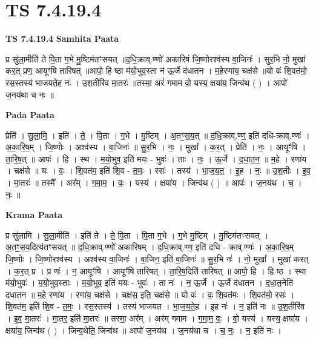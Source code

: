\documentclass[17pt]{extarticle}
\begin{document}
\section{ TS 7.4.19.4 }

\textbf{TS 7.4.19.4 } \newline
\textbf{Samhita Paata} \newline

प्र सु॑ला॒मीति॑ ते पि॒ता ग॒भे मु॒ष्टिम॑तꣳसयत् ॥द॒धि॒क्राव्.ण्णो॑ अकारिषं जि॒ष्णोरश्व॑स्य वा॒जिनः॑ । सुर॒भि नो॒ मुखा॑ कर॒त् प्रण॒ आयूꣳ॑षि तारिषत् ॥आपो॒ हि ष्ठा म॑यो॒भुव॒स्ता न॑ ऊ॒र्जे द॑धातन । म॒हेरणा॑य॒ चक्ष॑से ॥यो वः॑ शि॒वत॑मो॒ रस॒स्तस्य॑ भाजयते॒ह नः॑ । उ॒श॒तीरि॑व मा॒तरः॑ ॥तस्मा॒ अरं॑ गमाम वो॒ यस्य॒ क्षया॑य॒ जिन्व॑थ ( ) । आपो॑ ज॒नय॑था च नः ॥ \newline

\textbf{Pada Paata} \newline

प्रेति॑ । सु॒ला॒मि॒ । इति॑ । ते॒ । पि॒ता । ग॒भे । मु॒ष्टिम् । अ॒तꣳ॒॒स॒य॒त् ॥ द॒धि॒क्राव्.ण्ण॒ इति॑ दधि-क्राव्.ण्णः॑ । अ॒का॒रि॒ष॒म् । जि॒ष्णोः । अश्व॑स्य । वा॒जिनः॑ ॥ सु॒र॒भि । नः॒ । मुखा᳚ । क॒र॒त् । प्रेति॑ । नः॒ । आयूꣳ॑षि । ता॒रि॒ष॒त् ॥ आपः॑ । हि । स्थ । म॒यो॒भुव॒ इति॑ मयः - भुवः॑ । ताः । नः॒ । ऊ॒र्जे । द॒धा॒त॒न॒ ॥ म॒हे । रणा॑य । चक्ष॑से ॥ यः । वः॒ । शि॒वत॑म॒ इति॑ शि॒व - त॒मः॒ । रसः॑ । तस्य॑ । भा॒ज॒य॒त॒ । इ॒ह । नः॒ ॥ उ॒श॒तीः । इ॒व॒ । मा॒तरः॑ ॥ तस्मै᳚ । अर᳚म् । ग॒मा॒म॒ । वः॒ । यस्य॑ । क्षया॑य । जिन्व॑थ ( ) ॥ आपः॑ । ज॒नय॑थ । च॒ । नः॒ ॥  \newline


\textbf{Krama Paata} \newline

प्र सु॑लामि । सु॒ला॒मीति॑ । इति॑ ते । ते॒ पि॒ता । पि॒ता ग॒भे । ग॒भे मु॒ष्टिम् । मु॒ष्टिम॑तꣳसयत् । अ॒तꣳ॒॒स॒य॒दित्य॑तꣳसयत् ॥ द॒धि॒क्राव्.ण्णो॑ अकारिषम् । द॒धि॒क्राव्.ण्ण॒ इति॑ दधि - क्राव्.ण्णः॑ । अ॒का॒रि॒ष॒म् जि॒ष्णोः । जि॒ष्णोरश्व॑स्य । अश्व॑स्य वा॒जिनः॑ । वा॒जिन॒ इति॑ वा॒जिनः॑ ॥ सु॒र॒भि नः॑ । नो॒ मुखा᳚ । मुखा॑ करत् । क॒र॒त् प्र । प्र णः॑ । न॒ आयूꣳ॑षि । आयूꣳ॑षि तारिषत् । ता॒रि॒ष॒दिति॑ तारिषत् ॥ आपो॒ हि । हि ष्ठ । स्था म॑यो॒भुवः॑ । म॒यो॒भुव॒स्ताः । म॒यो॒भुव॒ इति॑ मयः - भुवः॑ । ता नः॑ । न॒ ऊ॒र्जे । ऊ॒र्जे द॑धातन । द॒धा॒त॒नेति॑ दधातन ॥ म॒हे रणा॑य । रणा॑य॒ चक्ष॑से । चक्ष॑स॒ इति॒ चक्ष॑से ॥ यो वः॑ । वः॒ शि॒वत॑मः । शि॒वत॑मो॒ रसः॑ । शि॒वत॑म॒ इति॑ शि॒व - त॒मः॒ । रस॒स्तस्य॑ । तस्य॑ भाजयत । भा॒ज॒य॒ते॒ह । इ॒ह नः॑ । न॒ इति॑ नः ॥ उ॒श॒तीरि॑व । इ॒व॒ मा॒तरः॑ । मा॒तर॒ इति॑ मा॒तरः॑ ॥ तस्मा॒ अर᳚म् । अर॑म् गमाम । ग॒मा॒म॒ वः॒ । वो॒ यस्य॑ । यस्य॒ क्षया॑य । क्षया॑य॒ जिन्व॑थ ( ) । जिन्व॒थेति॒ जिन्व॑थ ॥ आपो॑ ज॒नय॑थ । ज॒नय॑था च । च॒ नः॒ । न॒ इति॑ नः । \newline
\end{document}
